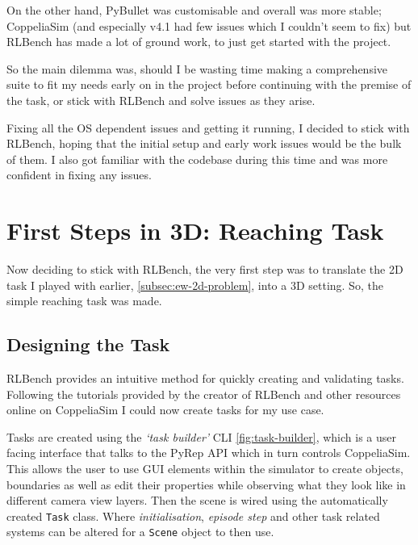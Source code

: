 On the other hand, PyBullet was customisable and overall was more stable; CoppeliaSim (and especially v4.1 had few issues which I couldn't seem to fix) but RLBench has made a lot of ground work, to just get started with the project.

So the main dilemma was, should I be wasting time making a comprehensive suite to fit my needs early on in the project before  continuing with the premise of the task, or stick with RLBench and solve issues as they arise.

Fixing all the OS dependent issues and getting it running, I decided to stick with RLBench, hoping that the initial setup and early work issues would be the bulk of them. I also got familiar with the codebase during this time and was more confident in fixing any issues.

\section{First Steps in 3D: Reaching Task}\label{sec:3d-reaching-tasks}
Now deciding to stick with RLBench, the very first step was to translate the 2D task I played with earlier, \ref{subsec:ew-2d-problem}, into a 3D setting. So, the simple reaching task was made. 

\subsection{Designing the Task}
RLBench provides an intuitive method for quickly creating and validating tasks. Following the tutorials provided by the creator of RLBench and other resources online on CoppeliaSim  I could now create tasks for my use case.

Tasks are created using the \emph{`task builder'} CLI \ref{fig:task-builder}, which is a user facing interface that talks to the PyRep API which in turn controls CoppeliaSim. This allows the user to use GUI elements within the simulator to create objects, boundaries as well as edit their properties while observing what they look like in different camera view layers. Then the scene is wired using the automatically created \verb|Task| class. Where \emph{initialisation}, \emph{episode step} and other task related systems can be altered for a \verb|Scene| object to then use.


